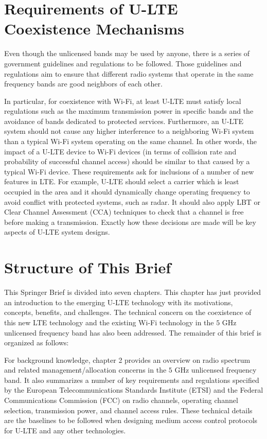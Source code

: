 \section{Requirements of U-LTE Coexistence Mechanisms}
\label{reqs}

Even though the unlicensed bands may be used by anyone, there is a series of government guidelines and regulations to be followed. Those guidelines and regulations aim to ensure that different radio systems that operate in the same frequency bands are good neighbors of each other.

In particular, for coexistence with Wi-Fi, at least U-LTE must satisfy local regulations such as the maximum transmission power in specific bands and the avoidance of bands dedicated to protected services. Furthermore, an U-LTE system should not cause any higher interference to a neighboring Wi-Fi system than a typical Wi-Fi system operating on the same channel. In other words, the impact of a U-LTE device to Wi-Fi devices (in terms of collision rate and probability of successful channel access) should be similar to that caused by a typical Wi-Fi device. These requirements ask for inclusions of a number of new features in LTE. For example, U-LTE should select a carrier which is least occupied in the area and it should dynamically change operating frequency to avoid conflict with protected systems, such as radar. It should also apply LBT or Clear Channel Assessment (CCA) techniques to check that a channel is free before making a transmission. Exactly how these decisions are made will be key aspects of U-LTE system designs.


\section{Structure of This Brief}

This Springer Brief is divided into seven chapters. This chapter has just provided an introduction to the emerging U-LTE technology with its motivations, concepts, benefits, and challenges. The technical concern on the coexistence of this new LTE technology and the existing Wi-Fi technology in the $5$ GHz unlicensed frequency band has also been addressed. The remainder of this brief is organized as follows: 

For background knowledge, chapter 2 provides an overview on radio spectrum and related management/allocation concerns in the $5$ GHz unlicensed frequency band. It also summarizes a number of key requirements and regulations specified by the European Telecommunications Standards Institute (ETSI) and the Federal Communications Commission (FCC) on radio channels, operating channel selection, transmission power, and channel access rules. These technical details are the baselines to be followed when designing medium access control protocols for U-LTE and any other technologies.

